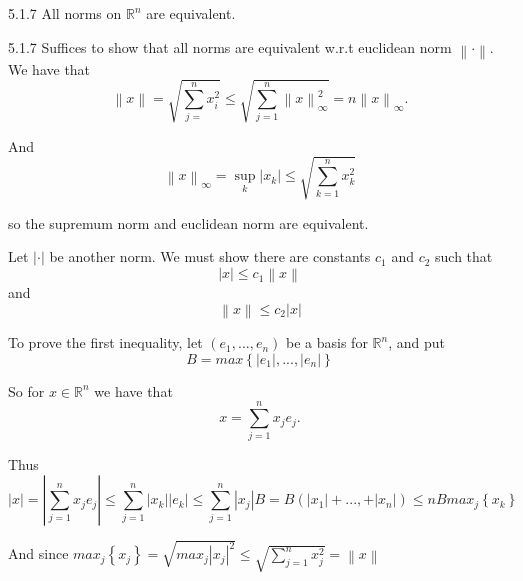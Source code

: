 \documentclass[a4paper,norsk]{article}
\renewcommand{\leq}{\leqslant}
\begin{document}
\begin{theorembox}{5.1.7}{}
All norms on $ \mathbb{R}^n $ are equivalent.

\begin{proofbox}{5.1.7}{}
  Suffices to show that all norms are equivalent w.r.t euclidean norm $ \left\lVert \cdot \right\rVert  $. We have that 
  \[
      \left\lVert x \right\rVert = \sqrt{ \sum_{ j= }^{ n } x_i ^{2}  } \leq \sqrt{ \sum_{ j=1 }^{ n } \left\lVert x \right\rVert _{\infty} ^{2}  } = n \left\lVert x \right\rVert _{\infty}.
  \]
  
  And
  \[
      \left\lVert x \right\rVert _{\infty} = \sup _k \left| x_k \right| \leq \sqrt{ \sum_{ k=1 }^{ n } x_k ^{2}  } 
  \]
  
  so the supremum norm and euclidean norm are equivalent.




  Let $ \left| \cdot \right|  $ be another norm. We must show there are constants $ c_1 $ and $ c_2 $ such that 
  \[
      \left| x \right| \leq c_1 \left\lVert x \right\rVert 
  \]
  and
  \[
      \left\lVert x \right\rVert \leq c_2 \left| x \right| 
  \]



  To prove the first inequality, let $ \left( e_1, ..., e_n \right)  $ be a basis for $ \mathbb{R}^n $, and put
  \[
      B = max \left\{ \left| e_1 \right| , ..., \left| e_n \right|  \right\} 
  \]
  
  So for $ x \in  \mathbb{R} ^{n}  $ we have that 
  \[
      x = \sum_{ j=1 }^{ n } x_j e_j.
  \]

  Thus
  \[
      \left| x \right| = \left| \sum_{ j=1 }^{ n } x_j e_j \right| \leq \sum_{ j=1 }^{ n } \left| x_k \right| \left| e_k \right| \leq \sum_{ j=1 }^{ n } \left| x_j \right| B = B \left( \left| x_1  \right| + ..., + \left| x_n \right|   \right) \leq n B max_j \left\{ x_k \right\}   
  \]


  And since $ max_j \left\{ x_j \right\} = \sqrt{ max_j \left| x_j \right|^2 } \leq \sqrt{ \sum_{ j=1 }^{ n } x_j^2 } = \left\lVert x \right\rVert  $ 
  
\end{proofbox}
\end{theorembox}
\end{document}
